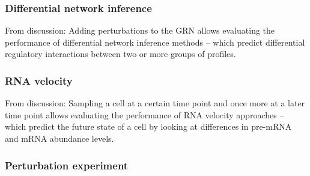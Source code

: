 \subsubsection{Differential network inference}
From discussion: Adding perturbations to the GRN allows evaluating the performance of differential network inference methods -- which predict differential regulatory interactions between two or more groups of profiles.
\subsubsection{RNA velocity}
From discussion: Sampling a cell at a certain time point and once more at a later time point allows evaluating the performance of RNA velocity approaches -- which predict the future state of a cell by looking at differences in pre-mRNA and mRNA abundance levels.


\subsubsection{Perturbation experiment}









